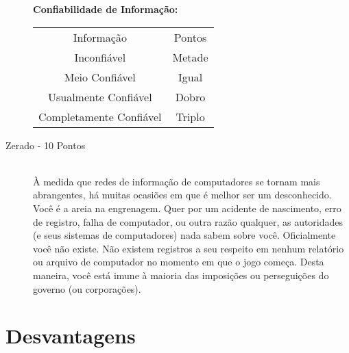\documentclass[a4paper]{article}
\begin{document}
\begin{description}
\textbf{Confiabilidade de Informação:}

\begin{table}[h]
 \centering
 {\renewcommand\arraystretch{1.25}
 \begin{tabular}{ l l }
  \cline{1-1}\cline{2-2}  
    \multicolumn{1}{|c|}{Informação \centering } &
    \multicolumn{1}{c|}{Pontos \centering }
  \\  
  \cline{1-1}\cline{2-2}  
    \multicolumn{1}{|c|}{Inconfiável \centering } &
    \multicolumn{1}{c|}{Metade \centering }
  \\  
  \cline{1-1}\cline{2-2}  
    \multicolumn{1}{|c|}{Meio Confiável \centering } &
    \multicolumn{1}{c|}{Igual \centering }
  \\  
  \cline{1-1}\cline{2-2}  
    \multicolumn{1}{|c|}{Usualmente Confiável \centering } &
    \multicolumn{1}{c|}{Dobro \centering }
  \\  
  \cline{1-1}\cline{2-2}  
    \multicolumn{1}{|c|}{Completamente Confiável \centering } &
    \multicolumn{1}{c|}{Triplo \centering }
  \\  
  \hline

 \end{tabular} }
\end{table}

  \item[Zerado - 10 Pontos] \hfill \\ À medida que redes de informação de computadores se tornam mais abrangentes, há muitas ocasiões em que é melhor
ser um desconhecido. Você é a areia na engrenagem. Quer por
um acidente de nascimento, erro de registro, falha de computador,
ou outra razão qualquer, as autoridades (e seus sistemas de
computadores) nada sabem sobre você. Oficialmente você não existe. Não existem registros a seu respeito em nenhum relatório ou arquivo de computador no momento em que o jogo começa. Desta maneira, você está imune à maioria das imposições ou perseguições do governo (ou corporações).
\end{description}

\section{Desvantagens}
\end{document}
